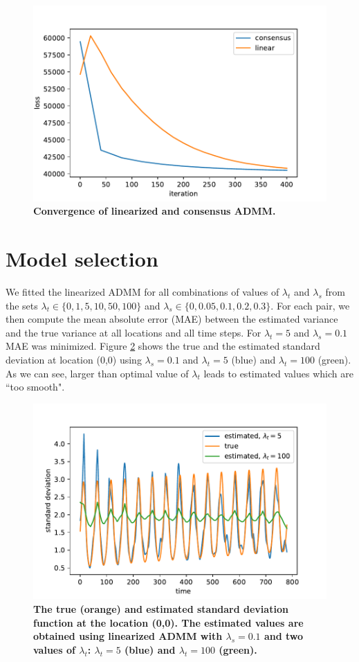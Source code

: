 \documentclass[12pt]{article}
\begin{document}
\begin{figure}[!h]
	\centering	
	\includegraphics[width=.7\linewidth]{Figures/convergence}		
	
	\caption{{\bf Convergence of linearized and consensus ADMM.}} \label{fig:convergence}
\end{figure}

\section{Model selection}
We fitted the linearized ADMM for all combinations of values of $\lambda_t$ and $\lambda_s$ from the sets $\lambda_t \in \{0,1,5,10,50,100\}$ and $\lambda_s \in \{0,0.05,0.1,0.2,0.3\}$. For each pair, we then compute the mean absolute error (MAE) between the estimated variance and the true variance at all locations and all time steps. For $\lambda_t=5$ and $\lambda_s=0.1$ MAE was minimized. Figure \ref{fig:true_fitted_var} shows the true and the estimated standard deviation at location (0,0) using $\lambda_s=0.1$ and $\lambda_t=5$ (blue) and $\lambda_t=100$ (green). As we can see, larger than optimal value of $\lambda_t$ leads to estimated values which are ``too smooth".

\begin{figure}[!h]
	\centering	
	\includegraphics[width=.7\linewidth]{Figures/true_fitted_var}		
	
	\caption{{\bf The true (orange) and estimated standard deviation function at the location (0,0). The estimated values are obtained using linearized ADMM with $\lambda_s=0.1$ and two values of $\lambda_t$: $\lambda_t=5$ (blue) and $\lambda_t=100$ (green).}} \label{fig:true_fitted_var}
\end{figure}



\end{document}
